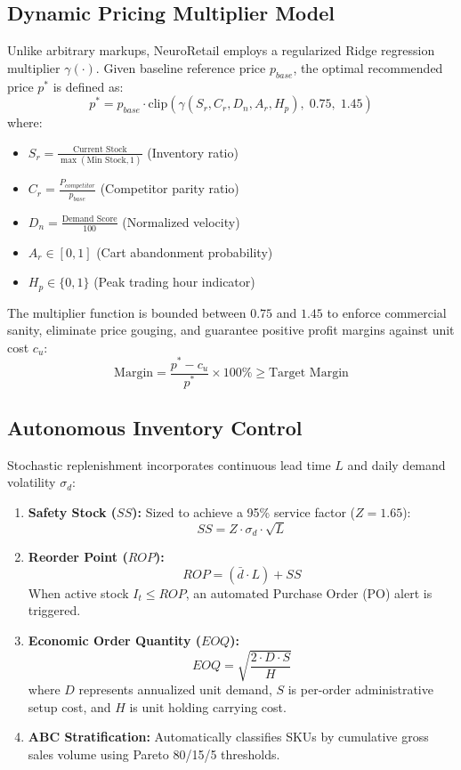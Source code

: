 \documentclass[conference]{IEEEtran}
\begin{document}
\subsection{Dynamic Pricing Multiplier Model}
Unlike arbitrary markups, NeuroRetail employs a regularized Ridge regression multiplier $\gamma(\cdot)$. Given baseline reference price $p_{base}$, the optimal recommended price $p^*$ is defined as:
\begin{equation}
p^* = p_{base} \cdot \text{clip}\left( \gamma(S_r, C_r, D_n, A_r, H_p), \; 0.75, \; 1.45 \right)
\end{equation}
where:
\begin{itemize}
    \item $S_r = \frac{\text{Current Stock}}{\max(\text{Min Stock}, 1)}$ (Inventory ratio)
    \item $C_r = \frac{P_{competitor}}{p_{base}}$ (Competitor parity ratio)
    \item $D_n = \frac{\text{Demand Score}}{100}$ (Normalized velocity)
    \item $A_r \in [0, 1]$ (Cart abandonment probability)
    \item $H_p \in \{0, 1\}$ (Peak trading hour indicator)
\end{itemize}
The multiplier function is bounded between $0.75$ and $1.45$ to enforce commercial sanity, eliminate price gouging, and guarantee positive profit margins against unit cost $c_u$:
\begin{equation}
\text{Margin} = \frac{p^* - c_u}{p^*} \times 100\% \ge \text{Target Margin}
\end{equation}

\subsection{Autonomous Inventory Control}
Stochastic replenishment incorporates continuous lead time $L$ and daily demand volatility $\sigma_d$:
\begin{enumerate}
    \item \textbf{Safety Stock ($SS$):} Sized to achieve a 95\% service factor ($Z = 1.65$):
    \begin{equation}
    SS = Z \cdot \sigma_d \cdot \sqrt{L}
    \end{equation}
    \item \textbf{Reorder Point ($ROP$):}
    \begin{equation}
    ROP = (\bar{d} \cdot L) + SS
    \end{equation}
    When active stock $I_t \le ROP$, an automated Purchase Order (PO) alert is triggered.
    \item \textbf{Economic Order Quantity ($EOQ$):}
    \begin{equation}
    EOQ = \sqrt{\frac{2 \cdot D \cdot S}{H}}
    \end{equation}
    where $D$ represents annualized unit demand, $S$ is per-order administrative setup cost, and $H$ is unit holding carrying cost.
    \item \textbf{ABC Stratification:} Automatically classifies SKUs by cumulative gross sales volume using Pareto 80/15/5 thresholds.
\end{enumerate}
\end{document}
